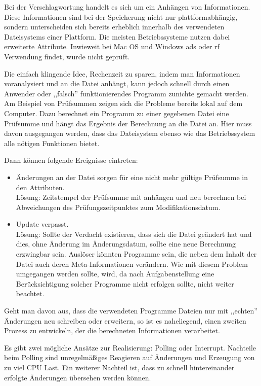 \documentclass[oneside, ngerman, toc=bibliography,bibliography=totoc,listof=entryprefix, open=right,numbers=noenddot,fontsize=12pt]{scrbook}
\begin{document}
Bei der Verschlagwortung handelt es sich um ein Anhängen von Informationen. Diese Informationen sind bei der Speicherung nicht nur plattformabhängig, sondern unterscheiden sich bereits erheblich innerhalb des verwendeten Dateisystems einer Plattform.
Die meisten Betriebssysteme nutzen dabei erweiterte Attribute. Inwieweit bei Mac OS und Windows \acrshort{ads} oder \acrshort{rf} Verwendung findet, wurde nicht geprüft.  
 
Die einfach klingende Idee, Rechenzeit zu sparen, indem man Informationen voranalysiert und an die Datei anhängt, kann jedoch schnell durch einen Anwender oder ,,falsch'' funktionierendes Programm zunichte gemacht werden. Am Beispiel von Prüfsummen zeigen sich die Probleme bereits lokal auf dem Computer. Dazu berechnet ein Programm zu einer gegebenen Datei eine Prüfsumme und hängt das Ergebnis der Berechnung an die Datei an. Hier muss davon ausgegangen werden, dass das Dateisystem ebenso wie das Betriebssystem alle nötigen Funktionen bietet.

\bigskip
Dann können folgende Ereignisse eintreten:
\begin{itemize}
	\item Änderungen an der Datei sorgen für eine nicht mehr gültige Prüfsumme in den Attributen.\\
    Lösung: Zeitstempel der Prüfsumme mit anhängen und neu berechnen bei Abweichungen des Prüfungszeitpunktes zum Modifikationsdatum.
    
	\item Update verpasst. \\
     Lösung: Sollte der Verdacht existieren, dass sich die Datei geändert hat und dies, ohne Änderung im Änderungsdatum, sollte eine neue Berechnung erzwingbar sein.
     Auslöser könnten Programme sein, die neben dem Inhalt der Datei auch deren Meta-Informationen verändern. Wie mit diesem Problem umgegangen werden sollte, wird, da nach Aufgabenstellung eine Berücksichtigung solcher Programme nicht erfolgen sollte, nicht weiter beachtet.
\end{itemize}

Geht man davon aus, dass die verwendeten Programme Dateien nur mit ,,echten'' Änderungen neu schreiben oder erweitern, so ist es naheliegend, einen zweiten Prozess zu entwickeln, der die berechneten Informationen verarbeitet.

Es gibt zwei mögliche Ansätze zur Realisierung: {Polling} oder {Interrupt}. Nachteile beim Polling sind unregelmäßiges Reagieren auf Änderungen und Erzeugung von zu viel CPU Last. Ein weiterer Nachteil ist, dass zu schnell hintereinander erfolgte Änderungen übersehen werden können.
\end{document}
